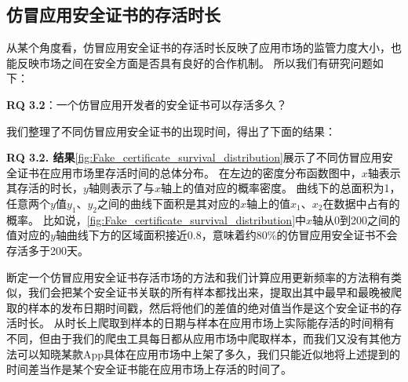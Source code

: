 \subsection{仿冒应用安全证书的存活时长}
从某个角度看，仿冒应用安全证书的存活时长反映了应用市场的监管力度大小，也能反映市场之间在安全方面是否具有良好的合作机制。
所以我们有研究问题如下：

{\bf RQ 3.2}：一个仿冒应用开发者的安全证书可以存活多久？

我们整理了不同仿冒应用安全证书的出现时间，得出了下面的结果：

{\bf RQ 3.2. 结果}\autoref{fig:Fake_certificate_survival_distribution}展示了不同仿冒应用安全证书在应用市场里存活时间的总体分布。
在左边的密度分布函数图中，$x$轴表示其存活的时长，$y$轴则表示了与$x$轴上的值对应的概率密度。
曲线下的总面积为1，任意两个$y$值$y_1$、$y_2$之间的曲线下面积是其对应的$x$轴上的值$x_1$、$x_2$在数据中占有的概率。
比如说，\autoref{fig:Fake_certificate_survival_distribution}中$x$轴从0到200之间的值对应的$y$轴曲线下方的区域面积接近0.8，意味着约80\%的仿冒应用安全证书不会存活多于200天。

断定一个仿冒应用安全证书存活市场的方法和我们计算应用更新频率的方法稍有类似，我们会把某个安全证书关联的所有样本都找出来，提取出其中最早和最晚被爬取的样本的发布日期时间戳，然后将他们的差值的绝对值当作是这个安全证书的存活时长。
从时长上爬取到样本的日期与样本在应用市场上实际能存活的时间稍有不同，但由于我们的爬虫工具每日都从应用市场中爬取样本，而我们又没有其他方法可以知晓某款App具体在应用市场中上架了多久，我们只能近似地将上述提到的时间差当作是某个安全证书能在应用市场上存活的时间了。

